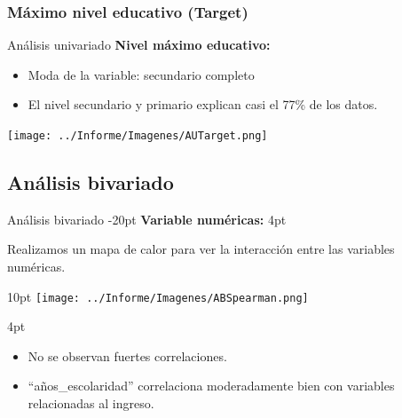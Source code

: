 \documentclass[pdf]{beamer}
\def\vspace{}%
\begin{document}
{           
    \subsubsection{Máximo nivel educativo (Target)}
    
\begin{frame}{Análisis univariado}
    \textbf{Nivel máximo educativo:}     
    \begin{itemize}
        \item Moda de la variable: secundario completo
        \item El nivel secundario y primario explican casi el 77\% de los datos.
    \end{itemize}    
    \begin{center}
        \texttt{[image: ../Informe/Imagenes/AUTarget.png]}    
    \end{center}
\end{frame}
    
    \subsection{Análisis bivariado}

\begin{frame}{Análisis bivariado}
    \vspace{-20pt}
    \textbf{Variable numéricas:}
    \vspace{4pt}

    Realizamos un mapa de calor para ver la interacción entre las variables numéricas.

    \begin{minipage}{0.5\textwidth}
        \vspace{10pt}
        \texttt{[image: ../Informe/Imagenes/ABSpearman.png]}
    \end{minipage}
    \begin{minipage}{0.48\textwidth}
        \vspace{4pt}
        \begin{itemize}
            \justifying%
            \item No se observan fuertes correlaciones.
            \item ``años\_escolaridad'' correlaciona moderadamente bien con variables relacionadas al ingreso.
        \end{itemize}
    \end{minipage}

\end{frame}
 
}
\end{document}
